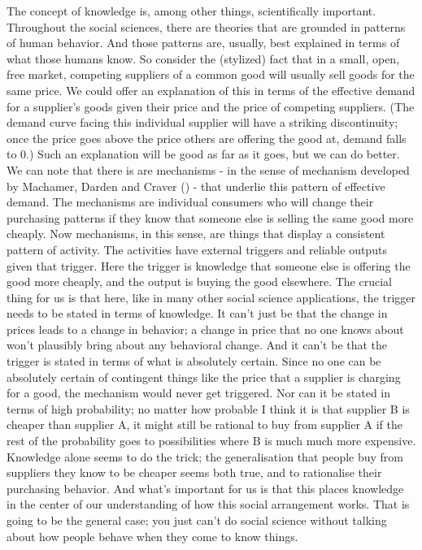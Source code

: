 \documentclass[
  12pt,
  letterpaper,
]{scrbook}
\begin{document}
The concept of knowledge is, among other things, scientifically
important. Throughout the social sciences, there are theories that are
grounded in patterns of human behavior. And those patterns are, usually,
best explained in terms of what those humans know. So consider the
(stylized) fact that in a small, open, free market, competing suppliers
of a common good will usually sell goods for the same price. We could
offer an explanation of this in terms of the effective demand for a
supplier's goods given their price and the price of competing suppliers.
(The demand curve facing this individual supplier will have a striking
discontinuity; once the price goes above the price others are offering
the good at, demand falls to 0.) Such an explanation will be good as far
as it goes, but we can do better. We can note that there is are
mechanisms - in the sense of mechanism developed by Machamer, Darden and
Craver () - that underlie this
pattern of effective demand. The mechanisms are individual consumers who
will change their purchasing patterns if they know that someone else is
selling the same good more cheaply. Now mechanisms, in this sense, are
things that display a consistent pattern of activity. The activities
have external triggers and reliable outputs given that trigger. Here the
trigger is knowledge that someone else is offering the good more
cheaply, and the output is buying the good elsewhere. The crucial thing
for us is that here, like in many other social science applications, the
trigger needs to be stated in terms of knowledge. It can't just be that
the change in prices leads to a change in behavior; a change in price
that no one knows about won't plausibly bring about any behavioral
change. And it can't be that the trigger is stated in terms of what is
absolutely certain. Since no one can be absolutely certain of contingent
things like the price that a supplier is charging for a good, the
mechanism would never get triggered. Nor can it be stated in terms of
high probability; no matter how probable I think it is that supplier B
is cheaper than supplier A, it might still be rational to buy from
supplier A if the rest of the probability goes to possibilities where B
is much much more expensive. Knowledge alone seems to do the trick; the
generalisation that people buy from suppliers they know to be cheaper
seems both true, and to rationalise their purchasing behavior. And
what's important for us is that this places knowledge in the center of
our understanding of how this social arrangement works. That is going to
be the general case; you just can't do social science without talking
about how people behave when they come to know things.
\end{document}
